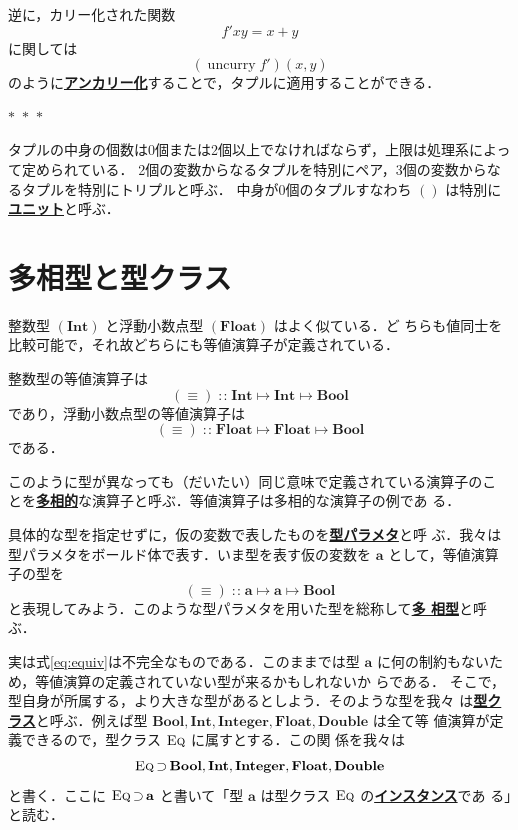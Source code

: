 \documentclass[a5paper,twoside,fleqn,draft]{jsbook}
\newcommand{\separator}{\begin{center}$*$~$*$~$*$\end{center}}
\newcommand{\keyword}[1]{{\underline{\textbf{#1}}}}
\DeclareMathOperator{\mSuperSet}{\supset}
\newcommand{\mSpecialFunc}[1]{\mathrm{#1}}
\DeclareMathOperator{\mUncurry}{\mSpecialFunc{uncurry}}
\DeclareMathOperator{\mIn}{{:\!:}}
\DeclareMathOperator{\mMapsTo}{\mapsto}
\newcommand{\mType}[1]{\mathbf{#1}}
\newcommand{\mBoolType}{\mType{Bool}}
\newcommand{\mFloatType}{\mType{Float}}
\newcommand{\mDoubleType}{\mType{Double}}
\newcommand{\mIntType}{\mType{Int}}
\newcommand{\mIntegerType}{\mType{Integer}}
\newcommand{\mGenericTypeClass}[1]{\textsc{#1}} %
\newcommand{\mEqTypeClass}{\mGenericTypeClass{Eq}}
\newcommand{\mProj}[2]{#1\mMapsTo#2}
\begin{document}
逆に，カリー化された関数
\begin{equation}
f'xy=x+y
\end{equation}
に関しては
\begin{equation}
(\mUncurry f')(x,y)
\end{equation}
のように\keyword{アンカリー化}することで，タプルに適用することができる．

\separator

タプルの中身の個数は0個または2個以上でなければならず，上限は処理系によって定められている．
2個の変数からなるタプルを特別にペア，3個の変数からなるタプルを特別にトリプルと呼ぶ．
中身が0個のタプルすなわち $()$ は特別に\keyword{ユニット}と呼ぶ．

\section{多相型と型クラス}

整数型 $(\mIntType)$ と浮動小数点型 $(\mFloatType)$ はよく似ている．ど
ちらも値同士を比較可能で，それ故どちらにも等値演算子が定義されている．

整数型の等値演算子は
\begin{equation}
(\equiv)\mIn\mProj{\mProj{\mIntType}{\mIntType}}{\mBoolType}
\end{equation}
であり，浮動小数点型の等値演算子は
\begin{equation}
(\equiv)\mIn\mProj{\mProj{\mFloatType}{\mFloatType}}{\mBoolType}
\end{equation}
である．

このように型が異なっても（だいたい）同じ意味で定義されている演算子のこ
とを\keyword{多相的}な演算子と呼ぶ．等値演算子は多相的な演算子の例であ
る．

具体的な型を指定せずに，仮の変数で表したものを\keyword{型パラメタ}と呼
ぶ．我々は型パラメタをボールド体で表す．いま型を表す仮の変数を
$\mType{a}$ として，等値演算子の型を
\begin{equation}
\label{eq:equiv}
(\equiv)\mIn\mProj{\mProj{\mType{a}}{\mType{a}}}{\mBoolType}
\end{equation}
と表現してみよう．このような型パラメタを用いた型を総称して\keyword{多
  相型}と呼ぶ．

実は式\eqref{eq:equiv}は不完全なものである．このままでは型 $\mType{a}$
に何の制約もないため，等値演算の定義されていない型が来るかもしれないか
らである．
そこで，型自身が所属する，より大きな型があるとしよう．そのような型を我々
は\keyword{型クラス}と呼ぶ．例えば型
$\mBoolType,\mIntType,\mIntegerType,\mFloatType,\mDoubleType$ は全て等
値演算が定義できるので，型クラス $\mEqTypeClass$ に属すとする．この関
係を我々は
\begin{equation}
  \mEqTypeClass
  \mSuperSet\mBoolType,\mIntType,\mIntegerType,\mFloatType,\mDoubleType
\end{equation}
と書く．ここに $\mEqTypeClass\mSuperSet\mType{a}$ と書いて「型
  $\mType{a}$ は型クラス $\mEqTypeClass$ の\keyword{インスタンス}であ
  る」と読む．
\end{document}

